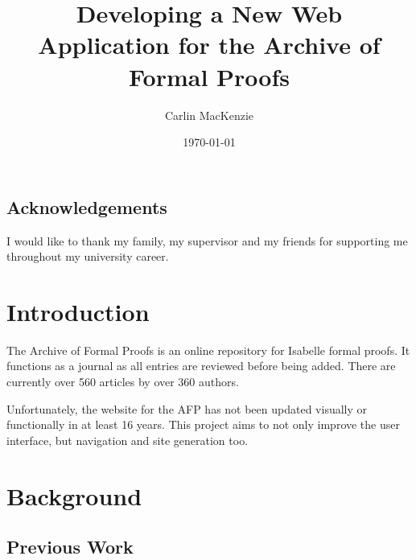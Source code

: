 \documentclass[frontabs,bsc,singlespacing,parskip,deptreport]{infthesis}
\begin{document}
\title{Developing a New Web Application for the Archive of Formal Proofs}

\author{Carlin MacKenzie}



\date{\today}


\maketitle

\section*{Acknowledgements}
I would like to thank my family, my supervisor and my friends for supporting me throughout my university career.

\tableofcontents


\chapter{Introduction}

The Archive of Formal Proofs is an online repository for Isabelle formal proofs. It functions as a journal as all entries are reviewed before being added. There are currently over 560 articles by over 360 authors. 

Unfortunately, the website for the AFP has not been updated visually or functionally in at least 16 years. This project aims to not only improve the user interface, but navigation and site generation too.

\chapter{Background}

\section{Previous Work}
\end{document}
